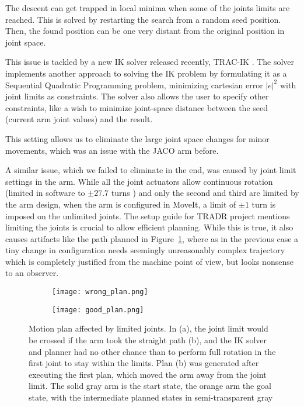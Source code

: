\documentclass[buriama8_dp.tex]{subfiles}
\begin{document}
The descent can get trapped in local minima when some of the joints limits are reached. This is solved by restarting the search from a random seed position. Then, the found position can be one very distant from the original position in joint space.

This issue is tackled by a new IK solver released recently, TRAC-IK \cite{tracik}. The solver implements another approach to solving the IK problem by formulating it as a Sequential Quadratic Programming problem, minimizing cartesian error \(|e|^2\) with joint limits as constraints. The solver also allows the user to specify other constraints, like a wish to minimize joint-space distance between the seed (current arm joint values) and the result.

This setting allows us to eliminate the large joint space changes for minor movements, which was an issue with the JACO arm before.

A similar issue, which we failed to eliminate in the end, was caused by joint limit settings in the arm. While all the joint actuators allow continuous rotation (limited in software to \(\pm 27.7\) turns \cite{jaco_spec}) and only the second and third are limited by the arm design, when the arm is configured in MoveIt, a limit of \(\pm 1\) turn is imposed on the unlimited joints. The setup guide for TRADR project mentions limiting the joints is crucial to allow efficient planning. While this is true, it also causes artifacts like the path planned in Figure~\ref{fig:wrong_plan_joint}, where as in the previous case a tiny change in configuration needs seemingly unreasonably complex trajectory which is completely justified from the machine point of view, but looks nonsense to an observer.

\begin{figure}[htp]
  \centering
  \begin{subfigure}[t]{0.49\textwidth}
    \texttt{[image: wrong\_plan.png]}
    \caption{}
    \label{fig:wrong_plan_joint}
  \end{subfigure}
  \begin{subfigure}[t]{0.49\textwidth}
    \texttt{[image: good\_plan.png]}
    \caption{}
    \label{fig:good_plan_joint}
  \end{subfigure}

  \caption[Non-optimal motion plan]{Motion plan affected by limited joints. In (a), the joint limit would be crossed if the arm took the straight path (b), and the IK solver and planner had no other chance than to perform full rotation in the first joint to stay within the limits. Plan (b) was generated after executing the first plan, which moved the arm away from the joint limit. The solid gray arm is the start state, the orange arm the goal state, with the intermediate planned states in semi-transparent gray}
  \label{fig:wrong_joints}
\end{figure}
\end{document}
